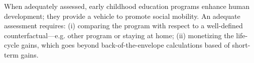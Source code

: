 \noindent When adequately assessed, early childhood education programs enhance human development; they provide a vehicle to promote social mobility. An adequate assessment requires: (i) comparing the program with respect to a well-defined counterfactual---e.g. other program or staying at home; (ii) monetizing the life-cycle gains, which goes beyond back-of-the-envelope calculations based of short-term gains. 

\singlespace



 